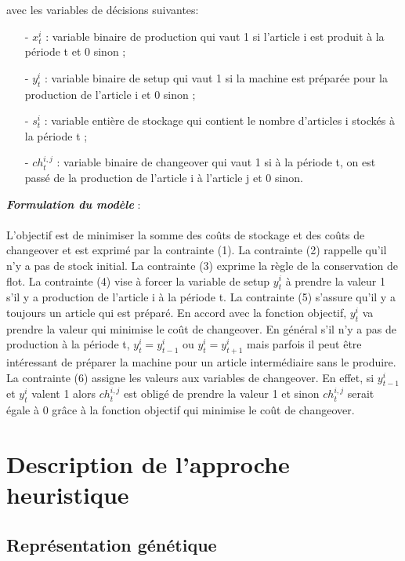\documentclass[12pt,a4paper]{article}
\begin{document}
		avec les variables de décisions suivantes: \\
		\begin{itemize}
			\item[-] $x_{t}^{i}$ : variable binaire de production qui vaut 1 si l’article i est produit à la période t et 0 sinon ;
			\item[-] $y_{t}^{i}$ : variable binaire de setup qui vaut 1 si la machine est préparée pour la production de l’article i et 0 sinon ;
			\item[-] $s_{t}^{i}$ : variable entière de stockage qui contient le nombre d’articles i stockés à la période t ; 
			\item[-] $ch_{t}^{i,j}$ : variable binaire de changeover qui vaut 1 si à la période t, on est passé de la production de l’article i à l’article j et 0 sinon.
		\end{itemize}
		\vspace*{.3cm}
		\textbf{\textsl{Formulation du modèle}} :\\
		\\
	\hspace*{.5cm} L'objectif est de minimiser la somme des coûts de stockage et des coûts de changeover et est exprimé par la contrainte (1). La contrainte (2) rappelle qu'il n'y a pas de stock initial. La contrainte (3) exprime la règle de la conservation de flot. La contrainte (4) vise à forcer la variable de setup $y_{t}^{i}$ à prendre la valeur 1 s’il y a production de l’article i à la période t. La contrainte (5) s'assure qu'il y a toujours un article qui est préparé. En accord avec la fonction objectif, $y_{t}^{i}$ va prendre la valeur qui minimise le coût de changeover. En général s’il n’y a pas de production à la période t,
$y_{t}^{i} = y_{t-1}^{i}$ ou $y_{t}^{i} = y_{t+1}^{i}$
mais parfois il peut être intéressant de préparer
la machine pour un article intermédiaire sans le produire. La contrainte (6) assigne les valeurs aux variables de changeover.
En effet, si $y_{t-1}^{i}$ et $y_{t}^{i}$ valent 1 alors $ch_{t}^{i,j}$ est obligé de prendre la valeur 1 et sinon $ch_{t}^{i,j}$ serait égale à 0 grâce à la fonction objectif qui minimise le coût de changeover.
		\section{Description de l'approche heuristique}
			\subsection{Représentation génétique}
\end{document}
